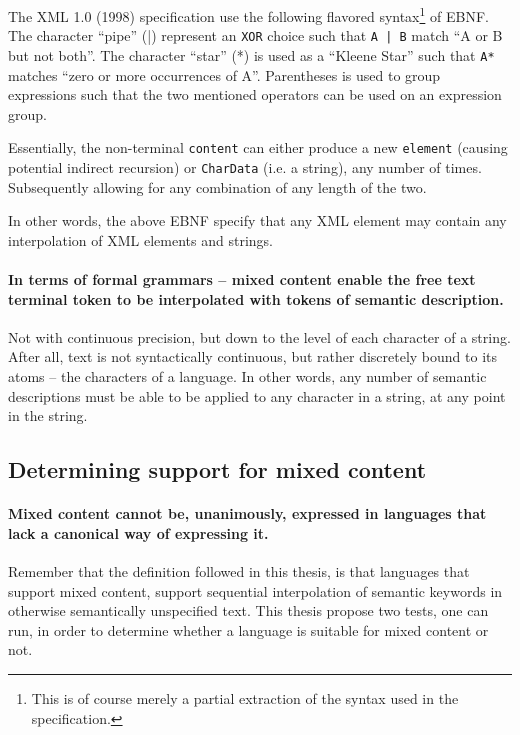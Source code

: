 \documentclass{scrreprt}
\begin{document}
The XML 1.0 (1998) specification use the following flavored syntax\footnote{This is of course merely a partial extraction of the syntax used in the specification.} of EBNF. The character ``pipe'' (|) represent an \texttt{XOR} choice such that \texttt{A | B} match ``A or B but not both''. The character ``star'' (*) is used as a ``Kleene Star'' such that \texttt{A*} matches ``zero or more occurrences of A''. Parentheses is used to group expressions such that the two mentioned operators can be used on an expression group.

Essentially, the non-terminal \texttt{content} can either produce a new \texttt{element} (causing potential indirect recursion) or \texttt{CharData} (i.e. a string), any number of times. Subsequently allowing for any combination of any length of the two.

In other words, the above EBNF specify that any XML element may contain any interpolation of XML elements and strings.

\paragraph{In terms of formal grammars -- mixed content enable the free text terminal token to be interpolated with tokens of semantic description.} Not with continuous precision, but down to the level of each character of a string. After all, text is not syntactically continuous, but rather discretely bound to its atoms -- the characters of a language. In other words, any number of semantic descriptions must be able to be applied to any character in a string, at any point in the string.



\subsection{Determining support for mixed content}
\paragraph{Mixed content cannot be, unanimously, expressed in languages that lack a canonical way of expressing it.} Remember that the definition followed in this thesis, is that languages that support mixed content, support sequential interpolation of semantic keywords in otherwise semantically unspecified text. This thesis propose two tests, one can run, in order to determine whether a language is suitable for mixed content or not.
\end{document}
